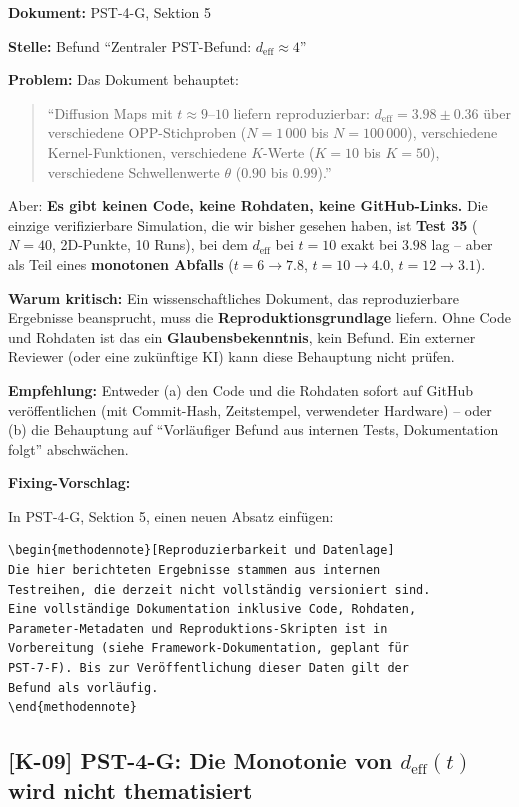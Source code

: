 \documentclass[11pt,a4paper]{article}
\newcommand{\K}[1]{\textbf{[K-#1]}}
\newcommand{\Dok}[1]{\noindent\textbf{Dokument:} #1\par\smallskip}
\newcommand{\Stelle}[1]{\noindent\textbf{Stelle:} #1\par\smallskip}
\newcommand{\Prob}[1]{\noindent\textbf{Problem:} #1\par\smallskip}
\newcommand{\Krit}[1]{\noindent\textbf{Warum kritisch:} #1\par\smallskip}
\newcommand{\Empf}[1]{\noindent\textbf{Empfehlung:} #1\par\smallskip}
\newenvironment{Fix}
  {\par\medskip\noindent\textbf{Fixing-Vorschlag:}\par\nobreak\smallskip}
  {\par\medskip}
\begin{document}
\Dok{PST-4-G, Sektion 5}
\Stelle{Befund ``Zentraler PST-Befund: $d_{\text{eff}} \approx 4$''}
\Prob{Das Dokument behauptet:
\begin{quote}
``Diffusion Maps mit $t \approx 9$--$10$ liefern reproduzierbar:
$d_{\text{eff}} = 3.98 \pm 0.36$ über verschiedene OPP-Stichproben
($N = 1\,000$ bis $N = 100\,000$), verschiedene Kernel-Funktionen,
verschiedene $K$-Werte ($K = 10$ bis $K = 50$), verschiedene
Schwellenwerte $\theta$ ($0.90$ bis $0.99$).''
\end{quote}
Aber: \textbf{Es gibt keinen Code, keine Rohdaten, keine
GitHub-Links.} Die einzige verifizierbare Simulation, die wir bisher
gesehen haben, ist \textbf{Test 35} ($N = 40$, 2D-Punkte, 10 Runs),
bei dem $d_{\text{eff}}$ bei $t = 10$ exakt bei $3.98$ lag -- aber als
Teil eines \textbf{monotonen Abfalls} ($t = 6 \to 7.8$, $t = 10 \to
4.0$, $t = 12 \to 3.1$).}
\Krit{Ein wissenschaftliches Dokument, das reproduzierbare Ergebnisse
beansprucht, muss die \textbf{Reproduktionsgrundlage} liefern. Ohne
Code und Rohdaten ist das ein \textbf{Glaubensbekenntnis}, kein
Befund. Ein externer Reviewer (oder eine zukünftige KI) kann diese
Behauptung nicht prüfen.}
\Empf{Entweder (a) den Code und die Rohdaten sofort auf GitHub
veröffentlichen (mit Commit-Hash, Zeitstempel, verwendeter
Hardware) -- oder (b) die Behauptung auf ``Vorläufiger Befund aus
internen Tests, Dokumentation folgt'' abschwächen.}
\begin{Fix}
In PST-4-G, Sektion 5, einen neuen Absatz einfügen:
\begin{verbatim}
\begin{methodennote}[Reproduzierbarkeit und Datenlage]
Die hier berichteten Ergebnisse stammen aus internen
Testreihen, die derzeit nicht vollständig versioniert sind.
Eine vollständige Dokumentation inklusive Code, Rohdaten,
Parameter-Metadaten und Reproduktions-Skripten ist in
Vorbereitung (siehe Framework-Dokumentation, geplant für
PST-7-F). Bis zur Veröffentlichung dieser Daten gilt der
Befund als vorläufig.
\end{methodennote}
\end{verbatim}
\end{Fix}

\subsection{\K{09} PST-4-G: Die Monotonie von $d_{\text{eff}}(t)$ wird nicht thematisiert}
\end{document}
